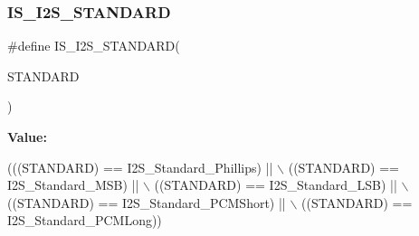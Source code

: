 \subsubsection{\texorpdfstring{I\+S\+\_\+\+I2\+S\+\_\+\+S\+T\+A\+N\+D\+A\+RD}{IS\_I2S\_STANDARD}}
{\footnotesize\ttfamily \#define I\+S\+\_\+\+I2\+S\+\_\+\+S\+T\+A\+N\+D\+A\+RD(\begin{DoxyParamCaption}\item[{}]{S\+T\+A\+N\+D\+A\+RD }\end{DoxyParamCaption})}

{\bfseries Value\+:}
\begin{DoxyCode}
(((STANDARD) == I2S\_Standard\_Phillips) || \(\backslash\)
                                   ((STANDARD) == I2S\_Standard\_MSB) || \(\backslash\)
                                   ((STANDARD) == I2S\_Standard\_LSB) || \(\backslash\)
                                   ((STANDARD) == I2S\_Standard\_PCMShort) || \(\backslash\)
                                   ((STANDARD) == I2S\_Standard\_PCMLong))
\end{DoxyCode}
